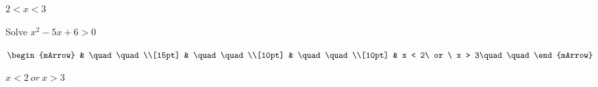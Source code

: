 \begin{mtask}[resume]
\begin{exercise}
\begin{envSolution}
\begin{shortsolution}
			     $2 < x <3$
			\end{shortsolution}				 
           \end{envSolution}
         \end{exercise}
   \task \begin{exercise} Solve $x^2 - 5x + 6 > 0$
           \begin{envSolution}
             $\begin{mArrow} 
			       & \quad \quad              \\[15pt]
                   & \quad \quad              \\[10pt]
		   		   & \quad \quad              \\[10pt]
				   & x < 2\ or \ x > 3\quad \quad 
              \end{mArrow}$
            \begin{shortsolution}  
			     $x < 2\ or \ x > 3$
			\end{shortsolution}				 
           \end{envSolution}
         \end{exercise}
\end{mtask}



